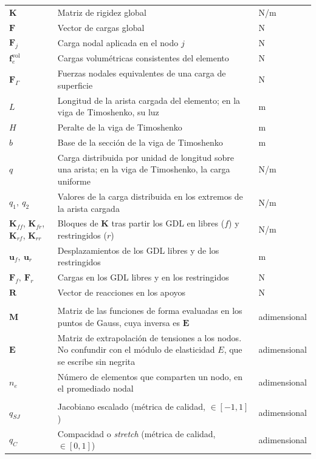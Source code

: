 \begin{longtable}{@{}>{\raggedright\arraybackslash}p{3.0cm}p{7.8cm}p{3.0cm}@{}}
$\bm{K}$ & Matriz de rigidez global & N/m \\
$\bm{F}$ & Vector de cargas global & N \\
$\bm{F}_j$ & Carga nodal aplicada en el nodo $j$ & N \\
$\bm{f}_e^{\text{vol}}$ & Cargas volumétricas consistentes del elemento & N \\
$\bm{F}_\Gamma$ & Fuerzas nodales equivalentes de una carga de superficie & N \\
$L$ & Longitud de la arista cargada del elemento; en la viga de Timoshenko, su luz & m \\
$H$ & Peralte de la viga de Timoshenko & m \\
$b$ & Base de la sección de la viga de Timoshenko & m \\
$q$ & Carga distribuida por unidad de longitud sobre una arista; en la viga de Timoshenko, la carga uniforme & N/m \\
$q_1,\ q_2$ & Valores de la carga distribuida en los extremos de la arista cargada & N/m \\
$\bm{K}_{ff}$, $\bm{K}_{fr}$, $\bm{K}_{rf}$, $\bm{K}_{rr}$ & Bloques de $\bm{K}$ tras partir los GDL en libres ($f$) y restringidos ($r$) & N/m \\
$\bm{u}_f,\ \bm{u}_r$ & Desplazamientos de los GDL libres y de los restringidos & m \\
$\bm{F}_f,\ \bm{F}_r$ & Cargas en los GDL libres y en los restringidos & N \\
$\bm{R}$ & Vector de reacciones en los apoyos & N \\
\addlinespace
\multicolumn{3}{@{}l}{\textbf{Recuperación de tensiones}} \\
\addlinespace
$\bm{M}$ & Matriz de las funciones de forma evaluadas en los puntos de Gauss, cuya inversa es $\bm{E}$ & adimensional \\
$\bm{E}$ & Matriz de extrapolación de tensiones a los nodos. No confundir con el módulo de elasticidad $E$, que se escribe sin negrita & adimensional \\
$n_e$ & Número de elementos que comparten un nodo, en el promediado nodal & adimensional \\
\addlinespace
\multicolumn{3}{@{}l}{\textbf{Calidad geométrica de la malla}} \\
\addlinespace
$q_{SJ}$ & Jacobiano escalado (métrica de calidad, \mbox{$\in[-1,1]$}) & adimensional \\
$q_C$ & Compacidad o \emph{stretch} (métrica de calidad, \mbox{$\in[0,1]$}) & adimensional \\

\end{longtable}
